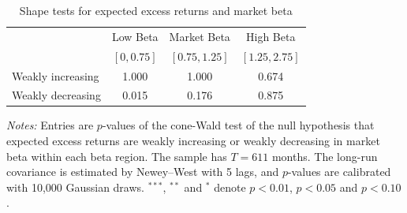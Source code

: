 \begin{table}[!htbp]
\centering
\caption{Shape tests for expected excess returns and market beta}
\label{tab:e1_shape_tests}
\begin{tabular}{lccc}
\toprule
 & Low Beta & Market Beta & High Beta \\
 & $[0, 0.75]$ & $[0.75, 1.25]$ & $[1.25, 2.75]$ \\
\midrule
Weakly increasing & 1.000 & 1.000 & 0.674 \\
Weakly decreasing & 0.015\rlap{$^{**}$} & 0.176 & 0.875 \\
\bottomrule
\end{tabular}
\par\medskip
\begin{minipage}{\linewidth}
\footnotesize\textit{Notes:} Entries are $p$-values of the cone-Wald test of the null hypothesis that expected excess returns are weakly increasing or weakly decreasing in market beta within each beta region. The sample has $T = 611$ months. The long-run covariance is estimated by Newey--West with 5 lags, and $p$-values are calibrated with 10,000 Gaussian draws. $^{***}$, $^{**}$ and $^{*}$ denote $p < 0.01$, $p < 0.05$ and $p < 0.10$.
\end{minipage}
\end{table}
